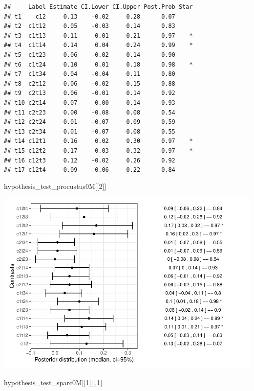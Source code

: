 \documentclass[
]{article}
\newenvironment{Shaded}{\begin{snugshade}}{\end{snugshade}}
\newcommand{\DecValTok}[1]{\textcolor[rgb]{0.00,0.00,0.81}{#1}}
\newcommand{\NormalTok}[1]{#1}
\begin{document}
\begin{verbatim}
##     Label Estimate CI.Lower CI.Upper Post.Prob Star
## t1    c12     0.13    -0.02     0.28      0.07     
## t2  c1t12     0.05    -0.03     0.14      0.83     
## t3  c1t13     0.11     0.01     0.21      0.97    *
## t4  c1t14     0.14     0.04     0.24      0.99    *
## t5  c1t23     0.06    -0.02     0.14      0.90     
## t6  c1t24     0.10     0.01     0.18      0.98    *
## t7  c1t34     0.04    -0.04     0.11      0.80     
## t8  c2t12     0.06    -0.02     0.15      0.88     
## t9  c2t13     0.06    -0.01     0.14      0.92     
## t10 c2t14     0.07     0.00     0.14      0.93     
## t11 c2t23     0.00    -0.08     0.08      0.54     
## t12 c2t24     0.01    -0.07     0.09      0.59     
## t13 c2t34     0.01    -0.07     0.08      0.55     
## t14 c12t1     0.16     0.02     0.30      0.97    *
## t15 c12t2     0.17     0.03     0.32      0.97    *
## t16 c12t3     0.12    -0.02     0.26      0.92     
## t17 c12t4     0.09    -0.06     0.22      0.84
\end{verbatim}

\begin{Shaded}
\begin{Highlighting}[]
\NormalTok{hypothesis\_test\_procustus0M[[}\DecValTok{2}\NormalTok{]]}
\end{Highlighting}
\end{Shaded}

\includegraphics{06_Publish_GUSO_ASIL_files/figure-latex/Contrasts0M-1.pdf}

\begin{Shaded}
\begin{Highlighting}[]
\NormalTok{hypothesis\_test\_sparc0M[[}\DecValTok{1}\NormalTok{]][,}\DecValTok{1}\NormalTok{]}
\end{Highlighting}
\end{Shaded}
\end{document}
